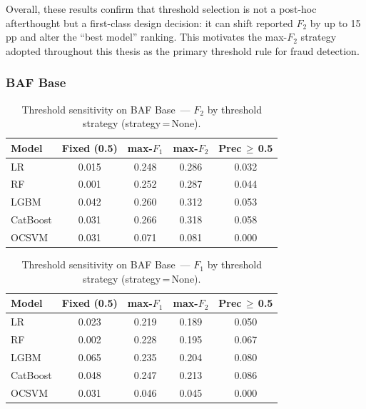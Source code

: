 Overall, these results confirm that threshold selection is not a post-hoc afterthought
but a first-class design decision: it can shift reported $F_2$ by up to 15\,pp
and alter the ``best model'' ranking.
This motivates the max-$F_2$ strategy adopted throughout this thesis
as the primary threshold rule for fraud detection.


\subsubsection{BAF Base}

\begin{table}[ht]
\centering
\caption{Threshold sensitivity on BAF Base~--- $F_2$ by threshold strategy (strategy\,=\,None).}
\label{tab:threshold_baf_f2}
\begin{tabular}{l c c c c}
\toprule
Model & Fixed (0.5) & max-$F_1$ & max-$F_2$ & Prec\,$\geq$\,0.5 \\
\midrule
LR         & 0.015 & 0.248 & 0.286 & 0.032 \\
RF         & 0.001 & 0.252 & 0.287 & 0.044 \\
LGBM       & 0.042 & 0.260 & 0.312 & 0.053 \\
CatBoost   & 0.031 & 0.266 & 0.318 & 0.058 \\
OCSVM      & 0.031 & 0.071 & 0.081 & 0.000 \\
\bottomrule
\end{tabular}
\end{table}

\begin{table}[ht]
\centering
\caption{Threshold sensitivity on BAF Base~--- $F_1$ by threshold strategy (strategy\,=\,None).}
\label{tab:threshold_baf_f1}
\begin{tabular}{l c c c c}
\toprule
Model & Fixed (0.5) & max-$F_1$ & max-$F_2$ & Prec\,$\geq$\,0.5 \\
\midrule
LR         & 0.023 & 0.219 & 0.189 & 0.050 \\
RF         & 0.002 & 0.228 & 0.195 & 0.067 \\
LGBM       & 0.065 & 0.235 & 0.204 & 0.080 \\
CatBoost   & 0.048 & 0.247 & 0.213 & 0.086 \\
OCSVM      & 0.031 & 0.046 & 0.045 & 0.000 \\
\bottomrule
\end{tabular}
\end{table}

